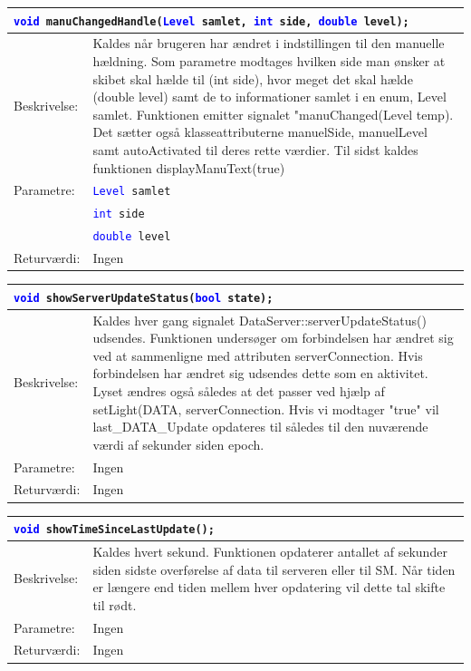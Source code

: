 \begin{table}[H]
\begin{tabular}{l p{12.5cm}}
\multicolumn{2}{l}{\texttt{\textcolor{blue}{void} manuChangedHandle(\textcolor{blue}{Level} samlet, \textcolor{blue}{int} side, \textcolor{blue}{double} level);}} \\
\hline
Beskrivelse:& Kaldes når brugeren har ændret i indstillingen til den manuelle hældning. Som parametre modtages hvilken side man ønsker at skibet skal hælde til (int side), hvor meget det skal hælde (double level) samt de to informationer samlet i en enum, Level samlet.
Funktionen emitter signalet "manuChanged(Level temp). Det sætter også klasseattributerne manuelSide, manuelLevel samt autoActivated til deres rette værdier.
Til sidst kaldes funktionen displayManuText(true)\\   
Parametre:&\texttt{\textcolor{blue}{Level} samlet}\\
&\texttt{\textcolor{blue}{int} side}\\
&\texttt{\textcolor{blue}{double} level}\\
Returværdi:&Ingen\\
\end{tabular}
\end{table}


\begin{table}[H]
\begin{tabular}{l p{12.5cm}}
\multicolumn{2}{l}{\texttt{\textcolor{blue}{void} showServerUpdateStatus(\textcolor{blue}{bool} state);}} \\
\hline
Beskrivelse:&Kaldes hver gang signalet DataServer::serverUpdateStatus() udsendes. Funktionen undersøger om forbindelsen har ændret sig ved at sammenligne med attributen serverConnection.
Hvis forbindelsen har ændret sig udsendes dette som en aktivitet. Lyset ændres også således at det passer ved hjælp af setLight(DATA, serverConnection. Hvis vi modtager "true" vil last\_DATA\_Update opdateres til således til den nuværende værdi af sekunder siden epoch.\\   
Parametre:&Ingen\\
Returværdi:&Ingen\\
\end{tabular}
\end{table}


\begin{table}[H]
\begin{tabular}{l p{12.5cm}}
\multicolumn{2}{l}{\texttt{\textcolor{blue}{void} showTimeSinceLastUpdate();}} \\
\hline
Beskrivelse:&Kaldes hvert sekund. Funktionen opdaterer antallet af sekunder siden sidste overførelse af data til serveren eller til SM. Når tiden er længere end tiden mellem hver opdatering vil dette tal skifte til rødt.\\    
Parametre:&Ingen\\
Returværdi:&Ingen\\
\end{tabular}
\end{table}


